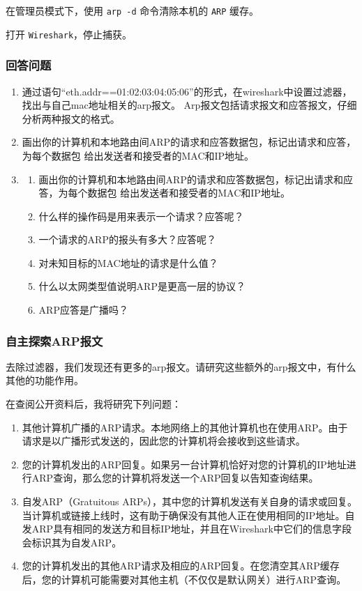 \documentclass{article}
\begin{document}
在管理员模式下，使用 \texttt{arp -d} 命令清除本机的 \texttt{ARP} 缓存。

打开 \texttt{Wireshark}，停止捕获。
\subsubsection{回答问题}

\begin{enumerate}[noitemsep]
	\item 通过语句“eth.addr==01:02:03:04:05:06”的形式，在wireshark中设置过滤器，找出与自己mac地址相关的arp报文。 Arp报文包括请求报文和应答报文，仔细分析两种报文的格式。
	\item 画出你的计算机和本地路由间ARP的请求和应答数据包，标记出请求和应答，为每个数据包 给出发送者和接受者的MAC和IP地址。
	\item
	\begin{enumerate}
		\item 画出你的计算机和本地路由间ARP的请求和应答数据包，标记出请求和应答，为每个数据包 给出发送者和接受者的MAC和IP地址。
		\item 什么样的操作码是用来表示一个请求？应答呢？
		\item 一个请求的ARP的报头有多大？应答呢？
		\item 对未知目标的MAC地址的请求是什么值？
		\item 什么以太网类型值说明ARP是更高一层的协议？
		\item ARP应答是广播吗？
	\end{enumerate}	
\end{enumerate}

\subsubsection{自主探索ARP报文}

去除过滤器，我们发现还有更多的arp报文。请研究这些额外的arp报文中，有什么其他的功能作用。

在查阅公开资料后，我将研究下列问题：

\begin{enumerate}[noitemsep]
	\item 其他计算机广播的ARP请求。本地网络上的其他计算机也在使用ARP。由于请求是以广播形式发送的，因此您的计算机将会接收到这些请求。
	\item 您的计算机发出的ARP回复。如果另一台计算机恰好对您的计算机的IP地址进行ARP查询，那么您的计算机将发送一个ARP回复以告知查询结果。
	\item 自发ARP（Gratuitous ARPs），其中您的计算机发送有关自身的请求或回复。当计算机或链接上线时，这有助于确保没有其他人正在使用相同的IP地址。自发ARP具有相同的发送方和目标IP地址，并且在Wireshark中它们的信息字段会标识其为自发ARP。
	\item 您的计算机发出的其他ARP请求及相应的ARP回复。在您清空其ARP缓存后，您的计算机可能需要对其他主机（不仅仅是默认网关）进行ARP查询。
\end{enumerate}
\end{document}
